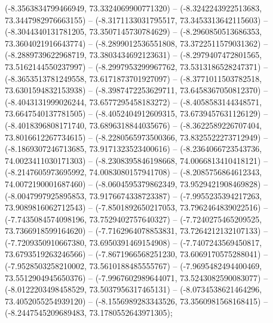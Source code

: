 (-8.3563834799466949, 73.3324069900771320) -- (-8.3242243922513683, 73.3447982976663155) -- (-8.3171133031795517, 73.3453313642115603) -- (-8.3044340131781205, 73.3507145730784629) -- (-8.2960850513686353, 73.3604021916643774) -- (-8.2899012536551808, 73.3722511579031362) -- (-8.2889739622968719, 73.3803434692123631) -- (-8.2979407472801565, 73.5162144550237997) -- (-8.2997953299967762, 73.5313186528247371) -- (-8.3653513781249558, 73.6171873701927097) -- (-8.3771011503782518, 73.6301594832153938) -- (-8.3987472253629711, 73.6458367050812370) -- (-8.4043131999026244, 73.6577295458183272) -- (-8.4058583144348571, 73.6647540137781505) -- (-8.4052404912609315, 73.6739457631126129) -- (-8.4018396808171740, 73.6896318844035676) -- (-8.3622589226707404, 73.8016612267734615) -- (-8.2280565973500366, 73.8325522273712949) -- (-8.1869307246713685, 73.9171323523400616) -- (-8.2364066723543736, 74.0023411030171303) -- (-8.2308395846198668, 74.0066813410418121) -- (-8.2147605973695992, 74.0083080157941708) -- (-8.2085756864612343, 74.0072190001687460) -- (-8.0604595379862349, 73.9529421908469828) -- (-8.0047997925895853, 73.9176674338723387) -- (-7.9955235394217263, 73.9089816062712543) -- (-7.8501892650217053, 73.7962464839022516) -- (-7.7435084574098196, 73.7529402757640327) -- (-7.7240275465209525, 73.7366918599164620) -- (-7.7162964078853831, 73.7264212132107133) -- (-7.7209350910667380, 73.6950391469154908) -- (-7.7407243569450817, 73.6793519263246566) -- (-7.8671966568251230, 73.6069170575288041) -- (-7.9528503258210002, 73.5610188485555767) -- (-7.9695482494400469, 73.5512904945650376) -- (-7.9967602989644071, 73.5243082590083077) -- (-8.0122203498458529, 73.5037956317465131) -- (-8.0734538621464296, 73.4052055254939120) -- (-8.1556989283343526, 73.3560981568168415) -- (-8.2447545209689483, 73.1780552643971305);
